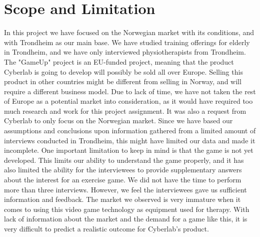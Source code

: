 \section{Scope and Limitation}
In this project we have focused on the Norwegian market with its conditions, and with Trondheim as our main base. We have studied training offerings for elderly in Trondheim, and we have only interviewed physiotherapists from Trondheim. The "GameUp" project is an EU-funded project, meaning that the product Cyberlab is going to develop will possibly be sold all over Europe. Selling this product in other countries might be different from selling in Norway, and will require a different business model. Due to lack of time, we have not taken the rest of Europe as a potential market into consideration, as it would have required too much research and work for this project assignment. It was also a request from Cyberlab to only focus on the Norwegian market. Since we have based our assumptions and conclusions upon information gathered from a limited amount of interviews conducted in Trondheim, this might have limited our data and made it incomplete. One important limitation to keep in mind is that the game is not yet developed. This limits our ability to understand the game properly, and it has also limited the ability for the interviewees to provide supplementary answers about the interest for an exercise game. We did not have the time to perform more than three interviews. However, we feel the interviewees gave us sufficient information and feedback. The market we observed is very immature when it comes to using this video game technology as equipment used for therapy. With lack of information about the market and the demand for a game like this, it is very difficult to predict a realistic outcome for Cyberlab’s product.

